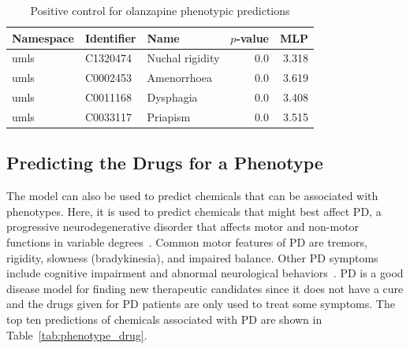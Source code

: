 \begin{table}
    \centering
    \begin{tabular}{|l|l|l|r|r|}
        \hline
        \textbf{Namespace} & \textbf{Identifier} & \textbf{Name} & \textbf{$p$-value} & \textbf{MLP} \\
        \hline
        umls & C1320474 & Nuchal rigidity & 0.0 & 3.318 \\
        \hline
        umls & C0002453 & Amenorrhoea & 0.0 & 3.619 \\
        \hline
        umls & C0011168 & Dysphagia & 0.0 & 3.408 \\
        \hline
        umls & C0033117 & Priapism & 0.0 & 3.515 \\
        \hline
    \end{tabular}
    \caption{Positive control for olanzapine phenotypic predictions}
    \label{tab:ps_olanzapine}
\end{table}


\subsection{Predicting the Drugs for a Phenotype}

The model can also be used to predict chemicals that can be associated with phenotypes.
Here, it is used to predict chemicals that might best affect \ac{PD}, a progressive neurodegenerative disorder that affects motor and non-motor functions in variable degrees~\cite{jankovic_parkinsons_2008}.
Common motor features of \ac{PD} are tremors, rigidity, slowness (bradykinesia), and impaired balance.
Other \ac{PD} symptoms include cognitive impairment and abnormal neurological behaviors~\cite{jankovic_parkinsons_2008}. 
\ac{PD} is a good disease model for finding new therapeutic candidates since it does not have a cure and the drugs given for \ac{PD} patients are only used to treat some symptoms.
The top ten predictions of chemicals associated with \ac{PD} are shown in Table~\ref{tab:phenotype_drug}.

